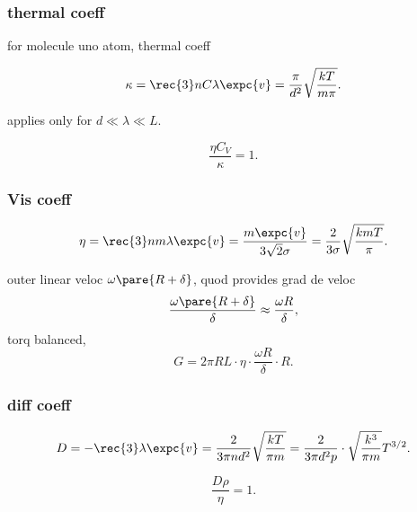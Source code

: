 \documentclass{ctexart}
\begin{document}

\subsubsection{thermal coeff} %
\label{ssub:thermal_coeff}

for molecule uno atom, thermal coeff
\begin{finale}
	\[ \kappa = \rec{3}nC\lambda\expc{v} = \frac{\pi}{d^2}\sqrt{\frac{kT}{m\pi}}. \]
\end{finale}

\begin{remark}
	applies only for $d \ll \lambda \ll L$.
\end{remark}

\begin{finale}
	\[ \frac{\eta C_V}{\kappa} = 1. \]
\end{finale}


\subsubsection{Vis coeff} %
\label{ssub:vis_coeff}

\begin{finale}
	\[ \eta = \rec{3}nm\lambda\expc{v} = \frac{m\expc{v}}{3\sqrt{2}\sigma} = \frac{2}{3\sigma}\sqrt{\frac{kmT}{\pi}}. \]
\end{finale}
\begin{ex}
	outer linear veloc $\omega\pare{R+\delta}$, quod provides grad de veloc
	\[ \frac{\omega\pare{R+\delta}}{\delta} \approx \frac{\omega R}{\delta}, \]
	torq balanced,
	\[ G = 2\pi RL\cdot\eta\cdot\frac{\omega R}{\delta}\cdot R. \]
\end{ex}


\subsubsection{diff coeff} %
\label{ssub:diff_coeff}

\begin{finale}
	\[ D = -\rec{3}\lambda\expc{v} = \frac{2}{3\pi nd^2}\sqrt{\frac{kT}{\pi m}} = \frac{2}{3\pi d^2 p}\cdot\sqrt{\frac{k^3}{\pi m}} T^{3/2}. \]
\end{finale}

\begin{finale}
	\[ \frac{D\rho}{\eta} = 1. \]
\end{finale}


\end{document}
